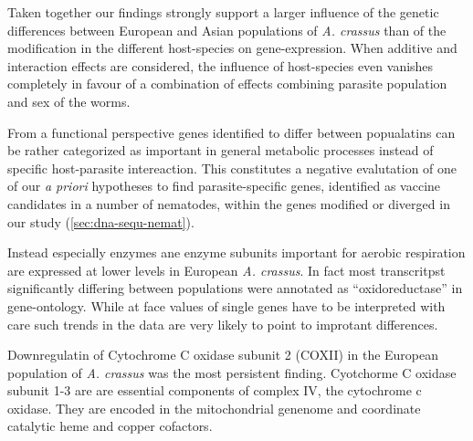 Taken together our findings strongly support a larger influence of the
genetic differences between European and Asian populations of
\textit{A. crassus} than of the modification in the different
host-species on gene-expression. When additive and interaction effects
are considered, the influence of host-species even vanishes completely
in favour of a combination of effects combining parasite population
and sex of the worms.

From a functional perspective genes identified to differ between
popualatins can be rather categorized as important in general
metabolic processes instead of specific host-parasite intereaction.
This constitutes a negative evalutation of one of our \textit{a
  priori} hypotheses to find parasite-specific genes, identified as
vaccine candidates in a number of nematodes, within the genes modified
or diverged in our study (\ref{sec:dna-sequ-nemat}).


Instead especially enzymes ane enzyme subunits important for aerobic
respiration are expressed at lower levels in European
\textit{A. crassus}. In fact most transcritpst significantly differing
between populations were annotated as ``oxidoreductase'' in
gene-ontology. While at face values of single genes have to be
interpreted with care such trends in the data are very likely to point
to improtant differences.

Downregulatin of Cytochrome C oxidase subunit 2 (COXII) in the
European population of \textit{A. crassus} was the most persistent
finding. Cyotchorme C oxidase subunit 1-3 are are essential components
of complex IV, the cytochrome c oxidase. They are encoded in the
mitochondrial genenome and coordinate catalytic heme and copper
cofactors.

